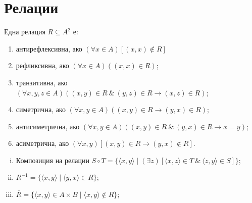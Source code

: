 \section{Релации}


\begin{dfn}
  Една релация $R \subseteq A^2$ е:
  \begin{enumerate}[1)]
  \item
    антирефлексивна, ако
    $(\forall x\in A)[(x,x)\not\in R]$
  \item
    рефликсивна, ако
    $(\forall x\in A)((x,x)\in R)$;
  \item
    транзитивна, ако
    $(\forall x,y,z\in A)((x,y)\in R\ \&\ (y,z)\in R \rightarrow (x,z)\in R)$;
  \item
    симетрична, ако
    $(\forall x,y\in A)((x,y)\in R \rightarrow (y,x)\in R)$;
  \item
    антисиметрична, ако
    $(\forall x,y\in A)((x,y)\in R\ \&\ (y,x)\in R \rightarrow x = y)$;
  \item
    асиметрична, ако
    $(\forall x,y)[(x,y)\in R \rightarrow (y,x)\not\in R]$.
\end{enumerate}
\end{dfn}

\begin{enumerate}[(i)]
\item
  Композиция на релации
  $S\circ T = \{\langle{x,y}\rangle \mid (\exists z)[\langle{x,z}\rangle\in T\ \&\ \langle{z,y}\rangle \in S]\}$;
\item
  $R^{-1} = \{\langle{x,y}\rangle \mid \langle{y,x}\rangle \in R\}$;
\item
  $\overline{R} = \{\langle{x,y}\rangle \in A\times B \mid\langle{x,y}\rangle\not\in R\}$;
\end{enumerate}

